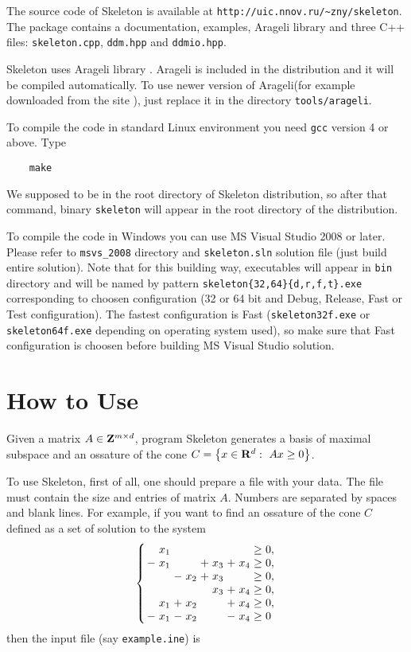 \documentclass{article}
\newcommand{\Skeleton}{{\sc Skeleton}\xspace}
\newcommand{\Arageli}{{\sc Arageli}\xspace}
\newcommand{\ZZ}{{\rm\bf Z}}
\newcommand{\RR}{{\rm\bf R}}
\newcommand{\set}[1]{\left\{ #1\right\}}
\newenvironment{narrowarray}[1]{\arraycolsep=0.15em\begin{array}{#1}}{\end{array}}
\begin{document}
The source code of \Skeleton is available at 
\verb$http://uic.nnov.ru/~zny/skeleton$.
The package contains a documentation, examples, \Arageli library and three C++ files:
\verb$skeleton.cpp$, \verb$ddm.hpp$ and \verb$ddmio.hpp$.

\Skeleton uses \Arageli library \cite{Arageli}.
\Arageli is included in the distribution and it will be compiled automatically.
To use newer version of \Arageli (for example downloaded from
the site \cite{Arageli}), just replace it in the directory
\verb$tools/arageli$.

To compile the code in standard Linux environment you need \verb$gcc$ version 4 or above. Type
\begin{verbatim}
    make
\end{verbatim}
We supposed to be in the root directory of \Skeleton distribution, so after that command, binary
\verb$skeleton$ will appear in the root directory of the distribution.

To compile the code in Windows you can use MS Visual Studio 2008 or later. Please refer to
\verb$msvs_2008$ directory and \verb$skeleton.sln$ solution file (just build entire solution).
Note that for this building way, executables will appear in \verb$bin$ directory and will be named by pattern
\verb$skeleton{32,64}{d,r,f,t}.exe$ corresponding to choosen configuration (32 or 64 bit and
Debug, Release, Fast or Test configuration). The fastest configuration is Fast (\verb$skeleton32f.exe$ or
\verb$skeleton64f.exe$ depending on operating system used), so make sure
that Fast configuration is choosen before building MS Visual Studio solution.


\section{How to Use}

Given a matrix $A\in\ZZ^{m\times d}$, program \Skeleton generates
a basis of maximal subspace and an ossature of the cone $C=\set{x\in\RR^d:~Ax\ge 0}$.

To use \Skeleton, first of all, one should prepare a file with your data. 
The file must contain the size and entries of matrix $A$.
Numbers are separated by spaces and blank lines.
For example, if you want to find an ossature of the cone $C$
defined as a set of solution to the system
$$
\left\{
\begin{narrowarray}{cccccccccl}
 & x_1 &   &     &   &    &   &     & \ge & 0, \\
-& x_1 &   &     &  +& x_3&  +& x_4 & \ge & 0, \\
 &     &  -& x_2 &  +& x_3&   &     & \ge & 0, \\
 &     &   &     &   & x_3&  +& x_4 & \ge & 0, \\
 & x_1 &  +& x_2 &   &    &  +& x_4 & \ge & 0, \\
-& x_1 &  -& x_2 &   &    &  -& x_4 & \ge & 0  \\
\end{narrowarray}
\right.
$$
then the input file (say \verb$example.ine$) is

 
\end{document}
